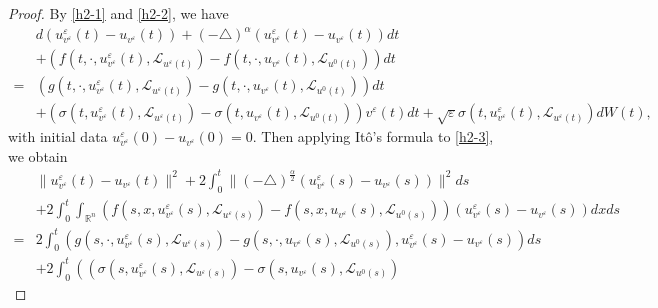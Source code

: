 \documentclass[11pt]{article}
\numberwithin{equation}{section}
\theoremstyle{plain}
\begin{document}
\begin{proof}
    By \eqref{h2-1} and \eqref{h2-2}, we have
    \begin{align} \label{h2-3}
        & d \left( u_{v^\varepsilon}^\varepsilon (t)
        - u_{v^\varepsilon}(t)
        \right)
        + (-\triangle)^\alpha
        \left( u_{v^\varepsilon}^\varepsilon (t)
        - u_{v^\varepsilon}(t)
        \right) dt
        \nonumber \\
        & + \left( f(t, \cdot, u_{v^\varepsilon}^\varepsilon(t), \mathcal{L}_{u^\varepsilon(t)} )
        - f(t, \cdot, u_{v^\varepsilon}(t), \mathcal{L}_{u^0(t)} )
        \right) dt  \nonumber \\
        = & \left( g(t, \cdot, u_{v^\varepsilon}^\varepsilon(t), \mathcal{L}_{u^\varepsilon(t)} )
        - g(t, \cdot, u_{v^\varepsilon}(t), \mathcal{L}_{u^0(t)} )
        \right) dt  \nonumber \\
        & + \left( \sigma(t, u_{v^\varepsilon}^\varepsilon(t), \mathcal{L}_{u^\varepsilon(t)} )
        - \sigma(t, u_{v^\varepsilon}(t), \mathcal{L}_{u^0(t)} )
        \right) v^\varepsilon(t) dt
        + \sqrt{\varepsilon} \sigma(t, u_{v^\varepsilon}^\varepsilon(t), \mathcal{L}_{u^\varepsilon(t)} ) dW(t),
    \end{align}
    with initial data
    $u_{v^\varepsilon}^\varepsilon(0) - u_{v^\varepsilon}(0) = 0$.
    Then applying It\^{o}'s formula to \eqref{h2-3}, we obtain
    \begin{align}\label{h2-4}
        & \| u_{v^\varepsilon}^\varepsilon(t) - u_{v^\varepsilon}(t) \|^2
        + 2 \int_0^t
        \| (-\triangle)^{\frac{\alpha}{2}}
        \left( u_{v^\varepsilon}^\varepsilon (s)
        - u_{v^\varepsilon}(s)
        \right)
        \|^2 ds  \nonumber \\
        & + 2 \int_{0}^{t} \int_{\mathbb{R}^n}
        \left( f(s, x, u_{v^\varepsilon}^\varepsilon(s), \mathcal{L}_{u^\varepsilon(s)} )
        - f(s, x, u_{v^\varepsilon}(s), \mathcal{L}_{u^0(s)} )
        \right)
        \left( u_{v^\varepsilon}^\varepsilon(s) - u_{v^\varepsilon}(s)
        \right) dx ds  \nonumber \\
        = & 2 \int_{0}^{t}
        \left( g(s, \cdot, u_{v^\varepsilon}^\varepsilon(s), \mathcal{L}_{u^\varepsilon(s)} )
        - g(s, \cdot, u_{v^\varepsilon}(s), \mathcal{L}_{u^0(s)} ),
        u_{v^\varepsilon}^\varepsilon(s) - u_{v^\varepsilon}(s)
        \right) ds  \nonumber \\
        & + 2 \int_{0}^{t}
        \left(
        \left( \sigma(s, u_{v^\varepsilon}^\varepsilon(s), \mathcal{L}_{u^\varepsilon(s)} )
        - \sigma(s, u_{v^\varepsilon}(s), \mathcal{L}_{u^0(s)})

\end{align}
\end{proof}
\end{document}
